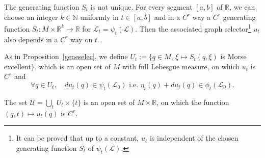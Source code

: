 \documentclass[AHL, Unicode, longabstracts, published]{cedram}
\newcommand*\cl{\mathcal{L}}
\newcommand*\cU{\mathcal{U}}
\newcommand*\cal{\mathcal}
\newcommand*\R{\mathbb{R}}
\newcommand*\N{\mathbb{N}}
\let\oldforall\forall
\renewcommand*{\forall}{\mathrel{\oldforall}}
\begin{document}
\begin{rema}
The generating function $S_t$ is not unique. For every segment $[a,b]$ of $\R$, we can choose an integer $k\in\N$ uniformly in $t\in[a, b]$ and in a $C^{r}$ way a $C^r$ generating function $S_t:M\times \R^k\rightarrow \R$ for {${\cal L}_t=\psi_t(\cl)$}. Then the associated graph selector\footnote{It can be proved that up to a constant, $u_t$ is independent of the chosen generating function $S_t$ of $\psi_t(\cl)$.} $u_t$ also depends in a $C^{r}$ way on $t$.
\end{rema}


As in Proposition~\ref{geneselec}, we define $U_t:=\{q \in M, \, \xi \mapsto S_t(q,\xi)$ is Morse excellent$\}$, which is an open set of $M$ with full Lebesgue measure, on which $u_t$ is $C^r$  and
\begin{equation}\label{Eselecnonexact}
\forall q\in U_t, \quad du_t(q) \in \psi_t(\cl_0) \text{ i.e. } \eta_t(q)+du_t(q)\in\phi_t(\cl_0).
\end{equation}



\begin{prop}\label{tUouvert}
The set ${\cU=}\underset{t}{\bigcup} \, U_t\times \{t\}$ is an open set of $M \times \R$, on which the function $(q,t) \mapsto u_t(q)$ is $C^{r}$.
\end{prop}
\end{document}
